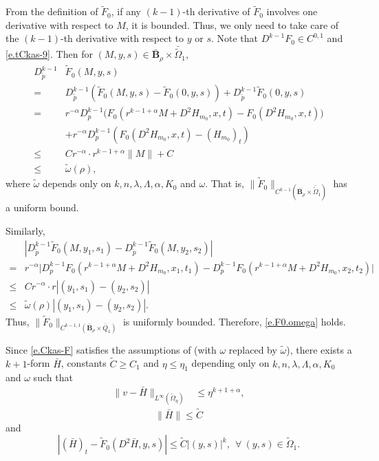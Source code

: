 \documentclass[preprint,12pt]{elsarticle}
\theoremstyle{definition}
\theoremstyle{remark}
\numberwithin{equation}{section}
\begin{document}
From the definition of $\tilde{F}_0$, if any $(k-1)$-th derivative of $\tilde{F}_0$ involves one derivative with respect to $M$, it is bounded. Thus, we only need to take care of the $(k-1)$-th derivative with respect to $y$ or $s$. Note that $D^{k-1}F_0\in C^{0,1}$ and \cref{e.tCkas-9}. Then for $(M,y,s)\in \bar{\textbf{B}}_\rho\times \bar{\tilde\Omega}_1$,
\begin{equation*}
  \begin{aligned}
D^{k-1}_{\tilde{p}}&\tilde{F}_0(M,y,s)\\
=&D^{k-1}_{\tilde{p}}\left(\tilde{F}_0(M,y,s)-\tilde{F}_0(0,y,s)\right)
+D^{k-1}_{\tilde{p}}\tilde{F}_0(0,y,s)\\
=&r^{-\alpha}D^{k-1}_{p}\Big(F_0(r^{k-1+\alpha}M+D^2H_{m_0},x,t)
-F_0(D^2H_{m_0},x,t)\Big)\\
&+r^{-\alpha}D^{k-1}_{p}\left(F_0(D^2H_{m_0},x,t)-(H_{m_0})_t\right)\\
\leq & Cr^{-\alpha}\cdot r^{k-1+\alpha}\|M\|+C\\
\leq& \tilde{\omega}(\rho),
  \end{aligned}
\end{equation*}
where $\tilde{\omega}$ depends only on $k,n,\lambda, \Lambda,\alpha,K_0$ and $\omega$. That is, $\|\tilde{F}_0\|_{C^{k-1}(\bar{\textbf{B}}_\rho\times \bar{\tilde\Omega}_1)}$ has a uniform bound.

Similarly,
\begin{equation*}
  \begin{aligned}
&\left|D^{k-1}_{\tilde{p}}\tilde{F}_0(M,y_1,s_1)-D^{k-1}_{\tilde{p}}\tilde{F}_0(M,y_2,s_2)\right|\\
=&r^{-\alpha}\Big|D^{k-1}_{p}F_0(r^{k-1+\alpha}M+D^2H_{m_0},x_1,t_1)
-D^{k-1}_{p}F_0(r^{k-1+\alpha}M+D^2H_{m_0},x_2,t_2)\Big|\\
\leq & Cr^{-\alpha}\cdot r|(y_1,s_1)-(y_2,s_2)|\\
\leq& \tilde{\omega}(\rho)|(y_1,s_1)-(y_2,s_2)|.
  \end{aligned}
\end{equation*}
Thus, $\|\tilde{F}_0\|_{C^{k-1,1}(\bar{\textbf{B}}_\rho\times \bar Q_1)}$ is uniformly bounded. Therefore, \cref{e.F0.omega} holds.

Since \cref{e.Ckas-F} satisfies the assumptions of  (with $\omega$ replaced by $\tilde{\omega}$), there exists a $k+1$-form $\bar{H}$, constants $\tilde{C}\geq C_1$ and $\eta\leq \eta_1$ depending only on $k,n,\lambda, \Lambda,\alpha,K_0$ and $\omega$ such that
\begin{equation*}
\begin{aligned}
    \|v-\bar{H}\|_{L^{\infty }(\tilde{\Omega} _{\eta})}&\leq \eta^{k+1+\alpha},
\end{aligned}
\end{equation*}
\begin{equation*}
\|\bar{H}\|\leq \tilde{C}
\end{equation*}
and
\begin{equation*}
  |(\bar{H})_t-\tilde F_0(D^2\bar{H},y,s)|\leq \tilde{C}|(y,s)|^{k}
  , ~~\forall ~(y,s)\in \tilde{\Omega}_{1}.
\end{equation*}
\end{document}
